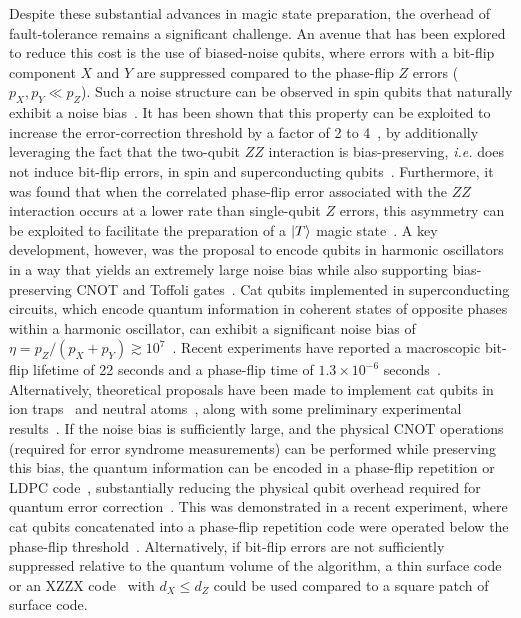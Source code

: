 \documentclass[%
 reprint,
superscriptaddress,
 amsmath,amssymb,
 aps,
]{revtex4-2}
\begin{document}
Despite these substantial advances in magic state preparation, the overhead of fault-tolerance remains a significant challenge. An avenue that has been explored to reduce this cost is the use of biased-noise qubits, where errors with a bit-flip component $X$ and $Y$ are suppressed compared to the phase-flip $Z$ errors ($p_X,p_Y \ll p_Z$). Such a noise structure can be observed in spin qubits that naturally exhibit a noise bias~\cite{steinacker2024300}. It has been shown that this property can be exploited to increase the error-correction threshold by a factor of 2 to 4~\cite{aliferis2008fault}, by additionally leveraging the fact that the two-qubit $ZZ$ interaction is bias-preserving, \textit{i.e.} does not induce bit-flip errors, in spin and superconducting qubits~\cite{taylor2005fault,brito2008efficient}. Furthermore, it was found that when the correlated phase-flip error associated with the $ZZ$ interaction occurs at a lower rate than single-qubit $Z$ errors, this asymmetry can be exploited to facilitate the preparation of a $\ket{T}$ magic state~\cite{webster2015reducing}. A key development, however, was the proposal to encode qubits in harmonic oscillators in a way that yields an extremely large noise bias while also supporting bias-preserving CNOT and Toffoli gates~\cite{mirrahimi2014dynamically,guillaud2019repetition,puri2020bias}. Cat qubits implemented in superconducting circuits, which encode quantum information in coherent states of opposite phases within a harmonic oscillator, can exhibit a significant noise bias of $\eta = p_Z / (p_X + p_Y) \gtrsim 10^7$~\cite{reglade2024quantum}. Recent experiments have reported a macroscopic bit-flip lifetime of 22 seconds and a phase-flip time of $1.3 \times 10^{-6}$ seconds~\cite{rousseau2025enhancing}. Alternatively, theoretical proposals have been made to implement cat qubits in ion traps~\cite{rojkov2024stabilization} and neutral atoms~\cite{omanakuttan2024fault}, along with some preliminary experimental results~\cite{debry2025error}. If the noise bias is sufficiently large, and the physical CNOT operations (required for error syndrome measurements) can be performed while preserving this bias, the quantum information can be encoded in a phase-flip repetition or LDPC code~\cite{ruiz2025ldpc}, substantially reducing the physical qubit overhead required for quantum error correction~\cite{chamberland2022building,gouzien2023performance}. This was demonstrated in a recent experiment, where cat qubits concatenated into a phase-flip repetition code were operated below the phase-flip threshold~\cite{putterman2025hardware}. Alternatively, if bit-flip errors are not sufficiently suppressed relative to the quantum volume of the algorithm, a thin surface code~\cite{hann2024hybrid} or an XZZX code~\cite{bonilla2021xzzx} with $d_X \le d_Z$ could be used compared to a square patch of surface code.
\end{document}
